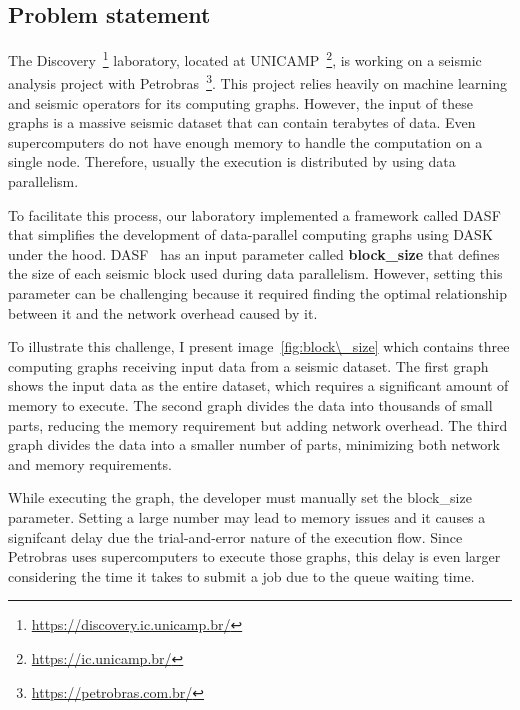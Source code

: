 \subsection{Problem statement}
\label{subsec:problem-statement}

The Discovery~\footnote{\url{https://discovery.ic.unicamp.br/}} laboratory, located at UNICAMP~\footnote{\url{https://ic.unicamp.br/}}, is working on a seismic analysis project with Petrobras~\footnote{\url{https://petrobras.com.br/}}.
This project relies heavily on machine learning and seismic operators for its computing graphs.
However, the input of these graphs is a massive seismic dataset that can contain terabytes of data.
Even supercomputers do not have enough memory to handle the computation on a single node.
Therefore, usually the execution is distributed by using data parallelism.

To facilitate this process, our laboratory implemented a framework called DASF~\cite{dasf} that simplifies the development of data-parallel computing graphs using DASK~\cite{dask} under the hood.
DASF~\cite{dasf} has an input parameter called \textbf{block\_size} that defines the size of each seismic block used during data parallelism.
However, setting this parameter can be challenging because it required finding the optimal relationship between it and the network overhead caused by it.

To illustrate this challenge, I present image~\ref{fig:block\_size} which contains three computing graphs receiving input data from a seismic dataset.
The first graph shows the input data as the entire dataset, which requires a significant amount of memory to execute.
The second graph divides the data into thousands of small parts, reducing the memory requirement but adding network overhead.
The third graph divides the data into a smaller number of parts, minimizing both network and memory requirements.


While executing the graph, the developer must manually set the block\_size parameter.
Setting a large number may lead to memory issues and it causes a signifcant delay due the trial-and-error nature of the execution flow.
Since Petrobras uses supercomputers to execute those graphs, this delay is even larger considering the time it takes to submit a job due to the queue waiting time.

